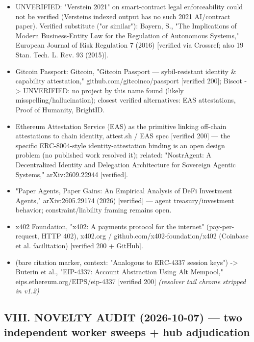 \documentclass[
]{article}
\begin{document}
\begin{itemize}
  cards," Google, a2a-protocol.org/latest/specification/ (a2aproject/A2A
  GitHub) {[}verified 200{]}.
\item
  UNVERIFIED: "Verstein 2021" on smart-contract legal enforceability
  could not be verified (Verstein\textquotesingle s indexed output has
  no such 2021 AI/contract paper). Verified substitute ("or similar"):
  Bayern, S., "The Implications of Modern Business-Entity Law for the
  Regulation of Autonomous Systems," European Journal of Risk Regulation
  7 (2016) {[}verified via Crossref; also 19 Stan. Tech. L. Rev. 93
  (2015){]}.
\item
  Gitcoin Passport: Gitcoin, "Gitcoin Passport --- sybil-resistant
  identity \& capability attestation," github.com/gitcoinco/passport
  {[}verified 200{]}; Biscot -\textgreater{} UNVERIFIED: no project by
  this name found (likely misspelling/hallucination); closest verified
  alternatives: EAS attestations, Proof of Humanity, BrightID.
\item
  Ethereum Attestation Service (EAS) as the primitive linking off-chain
  attestations to chain identity, attest.sh / EAS spec {[}verified
  200{]} --- the specific ERC-8004-style identity-attestation binding is
  an open design problem (no published work resolved it); related:
  "NostrAgent: A Decentralized Identity and Delegation Architecture for
  Sovereign Agentic Systems," arXiv:2609.22944 {[}verified{]}.
\item
  "Paper Agents, Paper Gains: An Empirical Analysis of DeFi Investment
  Agents," arXiv:2605.29174 (2026) {[}verified{]} --- agent
  treasury/investment behavior; constraint/liability framing remains
  open.
\item
  x402 Foundation, "x402: A payments protocol for the internet"
  (pay-per-request, HTTP 402), x402.org /
  github.com/x402-foundation/x402 (Coinbase et al. facilitation)
  {[}verified 200 + GitHub{]}.
\item
  (bare citation marker, context: "Analogous to ERC-4337 session keys")
  -\textgreater{} Buterin et al., "EIP-4337: Account Abstraction Using
  Alt Mempool," eips.ethereum.org/EIPS/eip-4337 {[}verified 200{]}
  \emph{(resolver tail chrome stripped in v1.2)}
\end{itemize}

\subsection{VIII. NOVELTY AUDIT (2026-10-07) --- two independent worker
sweeps + hub
adjudication}\label{viii-novelty-audit-2026-10-07--two-independent-worker-sweeps--hub-adjudication}
\end{document}
